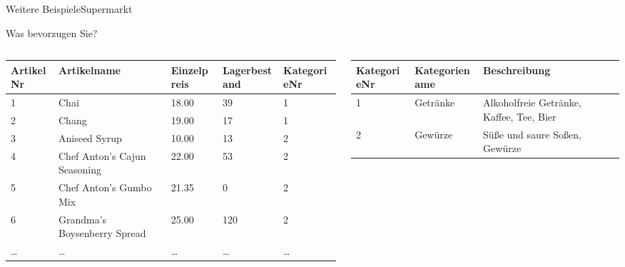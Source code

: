 \begin{frame}{Weitere Beispiele}{Supermarkt}
\begin{center}
Was bevorzugen Sie?
\end{center}

\begin{columns}
\begin{column}{.6\textwidth}
\begin{table}[H]
\tiny\centering
\begin{tabular}{@{}p{.6cm}|p{1.2cm}|p{.6cm}|p{.6cm}|b@{}}
\toprule
\textbf{ArtikelNr} & \textbf{Artikelname}         & \textbf{Einzelpreis} & \textbf{Lagerbestand} & \textbf{KategorieNr} \\ \midrule
1                  & Chai                         & 18.00                & 39                    & 1                    \\\hline
2                  & Chang                        & 19.00                & 17                    & 1                    \\\hline
3                  & Aniseed Syrup                & 10.00                & 13                    & 2                    \\\hline
4                  & Chef Anton's Cajun Seasoning & 22.00                & 53                    & 2                    \\\hline
5                  & Chef Anton's Gumbo Mix       & 21.35                & 0                     & 2                    \\\hline
6                  & Grandma's Boysenberry Spread & 25.00                & 120                   & 2                    \\\hline
…                  & …                            & …                    & …                     & …                    \\
\bottomrule
\end{tabular}
\end{table}
\end{column}
\begin{column}{.4\textwidth}
\begin{table}[H]
\tiny\centering
\begin{tabular}{@{}b|p{1.2cm}|p{1.2cm}@{}}
\toprule
\textbf{KategorieNr} & \textbf{Kategoriename}    & \textbf{Beschreibung}                             \\\midrule
1           & Getränke         & Alkoholfreie Getränke, Kaffee, Tee, Bier \\\hline
2           & Gewürze          & Süße und saure Soßen, Gewürze            \\\hline

\end{tabular}
\end{table}
\end{column}
\end{columns}
\end{frame}
